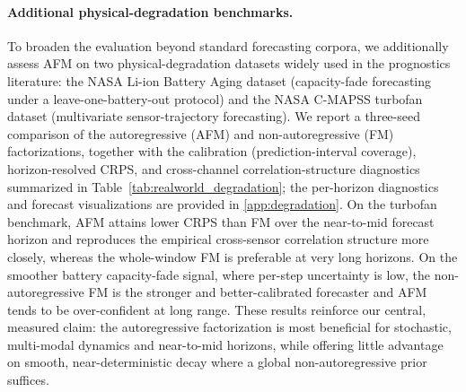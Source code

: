 \documentclass[a4paper,10pt,twocolumn,preprint,3p]{elsarticle}
\begin{document}
{\color{red}\paragraph{Additional physical-degradation benchmarks.} To broaden the evaluation beyond standard forecasting corpora, we additionally assess AFM on two physical-degradation datasets widely used in the prognostics literature: the NASA Li-ion Battery Aging dataset (capacity-fade forecasting under a leave-one-battery-out protocol) and the NASA C-MAPSS turbofan dataset (multivariate sensor-trajectory forecasting). We report a three-seed comparison of the autoregressive (AFM) and non-autoregressive (FM) factorizations, together with the calibration (prediction-interval coverage), horizon-resolved CRPS, and cross-channel correlation-structure diagnostics summarized in Table~\ref{tab:realworld_degradation}; the per-horizon diagnostics and forecast visualizations are provided in \ref{app:degradation}. On the turbofan benchmark, AFM attains lower CRPS than FM over the near-to-mid forecast horizon and reproduces the empirical cross-sensor correlation structure more closely, whereas the whole-window FM is preferable at very long horizons. On the smoother battery capacity-fade signal, where per-step uncertainty is low, the non-autoregressive FM is the stronger and better-calibrated forecaster and AFM tends to be over-confident at long range. These results reinforce our central, measured claim: the autoregressive factorization is most beneficial for stochastic, multi-modal dynamics and near-to-mid horizons, while offering little advantage on smooth, near-deterministic decay where a global non-autoregressive prior suffices.}
\begin{table}[t]\centering
\resizebox{\textwidth}{!}{}
\caption{\textcolor{red}{Multi-seed (three seeds) AFM-vs-FM comparison on the two real-world degradation benchmarks (mean$\pm$std). ``CRPS-Sum'' is the CRPS of the channel-summed forecast, an aggregate multivariate score; ``corr-dist'' is the Frobenius distance between the forecast and ground-truth cross-channel correlation matrices (lower is better for both). Per-horizon calibration/CRPS diagnostics, the cross-sensor correlation maps, and example probabilistic forecasts are provided in \ref{app:degradation}.}}
\label{tab:realworld_degradation}
\end{table}
\end{document}
